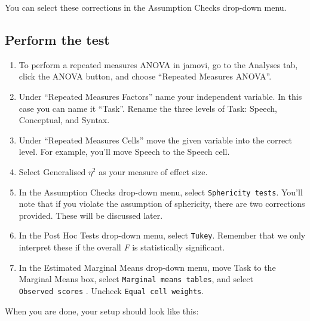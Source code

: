 \documentclass[
]{book}
\begin{document}
You can select these corrections in the Assumption Checks drop-down menu.

\hypertarget{perform-the-test-7}{%
\subsection{Perform the test}\label{perform-the-test-7}}

\begin{enumerate}
\def\labelenumi{\arabic{enumi}.}
\item
  To perform a repeated measures ANOVA in jamovi, go to the Analyses tab, click the ANOVA button, and choose ``Repeated Measures ANOVA''.
\item
  Under ``Repeated Measures Factors'' name your independent variable. In this case you can name it ``Task''. Rename the three levels of Task: Speech, Conceptual, and Syntax.
\item
  Under ``Repeated Measures Cells'' move the given variable into the correct level. For example, you'll move Speech to the Speech cell.
\item
  Select Generalised \(\eta^2\) as your measure of effect size.
\item
  In the Assumption Checks drop-down menu, select \texttt{Sphericity\ tests}. You'll note that if you violate the assumption of sphericity, there are two corrections provided. These will be discussed later.
\item
  In the Post Hoc Tests drop-down menu, select \texttt{Tukey}. Remember that we only interpret these if the overall \emph{F} is statistically significant.
\item
  In the Estimated Marginal Means drop-down menu, move Task to the Marginal Means box, select \texttt{Marginal\ means\ tables}, and select \texttt{Observed\ scores} . Uncheck \texttt{Equal\ cell\ weights}.
\end{enumerate}

When you are done, your setup should look like this:
\end{document}
